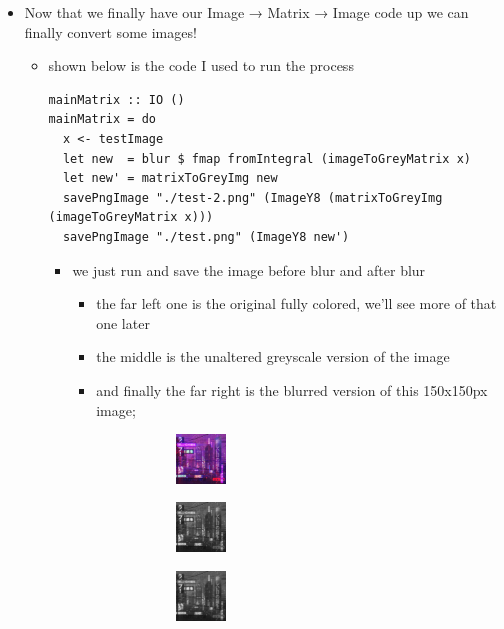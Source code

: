 \documentclass{article}
\begin{document}
\begin{enumerate}
\begin{enumerate}
\begin{itemize}
\item Now that we finally have our Image → Matrix → Image code up we can
finally convert some images!
\begin{itemize}
\item shown below is the code Ι used to run the process
\begin{verbatim}
mainMatrix :: IO ()
mainMatrix = do
  x <- testImage
  let new  = blur $ fmap fromIntegral (imageToGreyMatrix x)
  let new' = matrixToGreyImg new
  savePngImage "./test-2.png" (ImageY8 (matrixToGreyImg (imageToGreyMatrix x)))
  savePngImage "./test.png" (ImageY8 new')
\end{verbatim}
\begin{itemize}
\item we just run and save the image before blur and after blur
\begin{itemize}
\item the far left one is the original fully colored, we'll see more
of that one later
\item the middle is the unaltered greyscale version of the image
\item and finally the far right is the blurred version of this
150x150px image;
\begin{figure}
  \centering
  \begin{subfigure}
    \centering
    \includegraphics[width=0.2\textwidth]{../data/test-image.png}
  \end{subfigure}%
  \begin{subfigure}
    \centering
    \includegraphics[width=0.2\textwidth]{../data/image-original.png}
  \end{subfigure}
  \begin{subfigure}
    \centering
    \includegraphics[width=0.2\textwidth]{../data/image-blurred.png}

\end{subfigure}
\end{figure}
\end{itemize}
\end{itemize}
\end{itemize}
\end{itemize}
\end{enumerate}
\end{enumerate}
\end{document}
